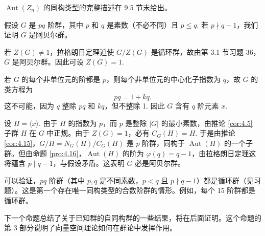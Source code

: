 \(\operatorname{Aut}(Z_n)\) 的同构类型的完整描述在 9.5 节末给出。

\begin{example}
假设 \(G\) 是 \(pq\) 阶群，其中 \(p\) 和 \(q\) 是素数（不必不同）且 \(p \leq q\). 若 \(p \nmid q - 1\)，我们证明 \(G\) 是阿贝尔群。

若 \(Z(G) \neq 1\)，拉格朗日定理迫使 \(G/Z(G)\) 是循环群，故由第 3.1 节习题 36，\(G\) 是阿贝尔群。因此可设 \(Z(G) = 1\).

若 \(G\) 的每个非单位元的阶都是 \(p\)，则每个非单位元的中心化子指数为 \(q\)，故 \(G\) 的类方程为
\[
pq = 1 + kq.
\]
这不可能，因为 \(q\) 整除 \(pq\) 和 \(kq\)，但不整除 1. 因此 \(G\) 含有 \(q\) 阶元素 \(x\).

设 \(H = \langle x \rangle\). 由于 \(H\) 的指数为 \(p\)，而 \(p\) 是整除 \(|G|\) 的最小素数，由推论 \ref{cor:4.5} 子群 \(H\) 在 \(G\) 中正规。由于 \(Z(G) = 1\)，必有 \(C_G(H) = H\). 于是由推论 \ref{cor:4.15}，\(G/H = N_G(H)/C_G(H)\) 是 \(p\) 阶群，同构于 \(\operatorname{Aut}(H)\) 的一个子群。但由命题 \ref{pro:4.16}，\(\operatorname{Aut}(H)\) 的阶为 \(\varphi(q) = q - 1\)，由拉格朗日定理这将蕴含 \(p \mid q - 1\)，与假设矛盾。这表明 \(G\) 必是阿贝尔群。
\end{example}

可以验证，\(pq\) 阶群（其中 \(p, q\) 是不同素数，\(p < q\) 且 \(p \nmid q - 1\)）都是循环群（见习题）。这是第一个存在唯一同构类型的合数阶群的情形。例如，每个 15 阶群都是循环群。

下一个命题总结了关于已知群的自同构群的一些结果，将在后面证明。这个命题的第 3 部分说明了向量空间理论如何在群论中发挥作用。


